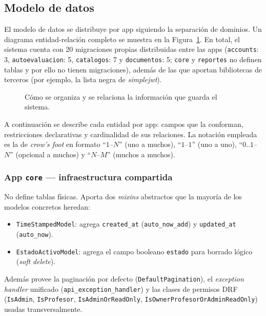 \subsection{Modelo de datos}

El modelo de datos se distribuye por app siguiendo la separación de dominios. Un diagrama entidad-relación completo se muestra en la Figura~\ref{fig:er}. En total, el sistema cuenta con 20 migraciones propias distribuidas entre las apps (\texttt{accounts}: 3, \texttt{autoevaluacion}: 5, \texttt{catalogos}: 7 y \texttt{documentos}: 5; \texttt{core} y \texttt{reportes} no definen tablas y por ello no tienen migraciones), además de las que aportan bibliotecas de terceros (por ejemplo, la lista negra de \emph{simplejwt}).

\begin{figure}[!htbp]
    \centering
    \resizebox{\textwidth}{!}{}
    \caption{Cómo se organiza y se relaciona la información que guarda el sistema.}
    \label{fig:er}
\end{figure}

A continuación se describe cada entidad por app: campos que la conforman, restricciones declarativas y cardinalidad de sus relaciones. La notación empleada es la de \emph{crow's foot} en formato ``$1$--$N$'' (uno a muchos), ``$1$--$1$'' (uno a uno), ``$0..1$--$N$'' (opcional a muchos) y ``$N$--$M$'' (muchos a muchos).

\subsubsection*{App \texttt{core} --- infraestructura compartida}

No define tablas físicas. Aporta dos \emph{mixins} abstractos que la mayoría de los modelos concretos heredan:

\begin{itemize}
    \item \texttt{TimeStampedModel}: agrega \texttt{created\_at} (\texttt{auto\_now\_add}) y \texttt{updated\_at} (\texttt{auto\_now}).
    \item \texttt{EstadoActivoModel}: agrega el campo booleano \texttt{estado} para borrado lógico (\emph{soft delete}).
\end{itemize}

Además provee la paginación por defecto (\texttt{DefaultPagination}), el \emph{exception handler} unificado (\texttt{api\_exception\_handler}) y las clases de permisos DRF (\texttt{IsAdmin}, \texttt{IsProfesor}, \texttt{IsAdminOrReadOnly}, \texttt{IsOwnerProfesorOrAdminReadOnly}) usadas transversalmente.

